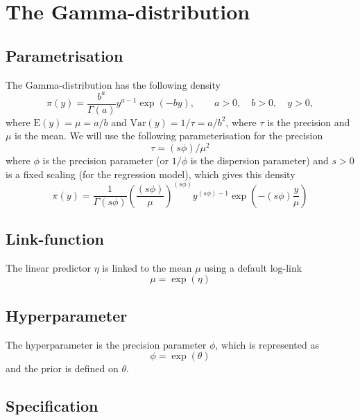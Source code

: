 \documentclass[a4paper,11pt]{article}
\begin{document}
\section*{The Gamma-distribution}

\subsection*{Parametrisation}

The Gamma-distribution has the following density
\begin{displaymath}
    \pi(y) = \frac{b^{a}}{\Gamma(a)} y^{a-1} \exp(-by), \qquad a>0,
    \quad b>0, \quad y >0,
\end{displaymath}
where $\text{E}(y) = \mu = a/b$ and $\text{Var}(y) = 1/\tau = a/b^{2}$,
where $\tau$ is the precision and $\mu$ is the mean. We will use the
following parameterisation for the precision
\begin{displaymath}
    \tau = (s\phi) / \mu^{2}
\end{displaymath}
where $\phi$ is the precision parameter (or $1/\phi$ is the dispersion
parameter) and $s>0$ is a fixed scaling (for the regression model),
which gives this density
\begin{displaymath}
    \pi(y) = \frac{1}{\Gamma(s\phi)}
    \left(\frac{(s\phi)}{\mu}\right)^{(s\phi)}
    y^{(s\phi) -1} \exp\left(-(s\phi) \frac{y}{\mu}\right)
\end{displaymath}


\subsection*{Link-function}

The linear predictor $\eta$ is linked to the mean $\mu$ using a
default log-link
\begin{displaymath}
    \mu = \exp(\eta)
\end{displaymath}

\subsection*{Hyperparameter}

The hyperparameter is the precision parameter $\phi$, which is
represented as
\begin{displaymath}
    \phi = \exp(\theta)
\end{displaymath}
and the prior is defined on $\theta$.

\subsection*{Specification}
\end{document}
